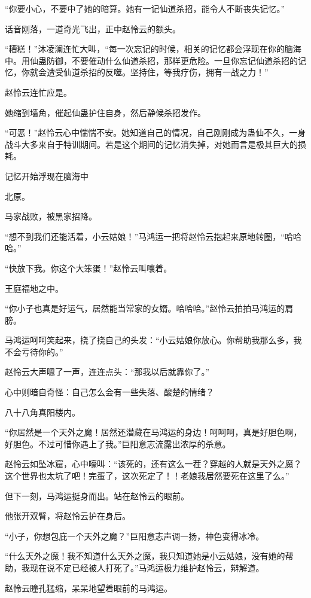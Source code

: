 \begin{this_body}
“你要小心，不要中了她的暗算。她有一记仙道杀招，能令人不断丧失记忆。”

话音刚落，一道奇光飞出，正中赵怜云的额头。

“糟糕！”沐凌澜连忙大叫，“每一次忘记的时候，相关的记忆都会浮现在你的脑海中。用仙蛊防御，不要催动什么仙道杀招，那样更危险。一旦你忘记仙道杀招的记忆，你就会遭受仙道杀招的反噬。坚持住，等我疗伤，拥有一战之力！”

赵怜云连忙应是。

她缩到墙角，催起仙蛊护住自身，然后静候杀招发作。

“可恶！”赵怜云心中惴惴不安。她知道自己的情况，自己刚刚成为蛊仙不久，一身战斗大多来自于特训期间。若是这个期间的记忆消失掉，对她而言是极其巨大的损耗。

记忆开始浮现在脑海中

北原。

马家战败，被黑家招降。

“想不到我们还能活着，小云姑娘！”马鸿运一把将赵怜云抱起来原地转圈，“哈哈哈。”

“快放下我。你这个大笨蛋！”赵怜云叫嚷着。

王庭福地之中。

“你小子也真是好运气，居然能当常家的女婿。哈哈哈。”赵怜云拍拍马鸿运的肩膀。

马鸿运呵呵笑起来，挠了挠自己的头发：“小云姑娘你放心。你帮助我那么多，我不会亏待你的。”

赵怜云大声嗯了一声，连连点头：“那我以后就靠你了。”

心中则暗自奇怪：自己怎么会有一些失落、酸楚的情绪？

八十八角真阳楼内。

“你居然是一个天外之魔！居然还潜藏在马鸿运的身边！呵呵呵，真是好胆色啊，好胆色。不过可惜你遇上了我。”巨阳意志流露出浓厚的杀意。

赵怜云如坠冰窟，心中嚎叫：“该死的，还有这么一茬？穿越的人就是天外之魔？这个世界也太坑了吧！完蛋了，这次死定了！！老娘我居然要死在这里了么。”

但下一刻，马鸿运挺身而出。站在赵怜云的眼前。

他张开双臂，将赵怜云护在身后。

“小子，你想包庇一个天外之魔？”巨阳意志声调一扬，神色变得冰冷。

“什么天外之魔！我不知道什么天外之魔，我只知道她是小云姑娘，没有她的帮助，我现在说不定已经被人打死了。”马鸿运极力维护赵怜云，辩解道。

赵怜云瞳孔猛缩，呆呆地望着眼前的马鸿运。


\end{this_body}
